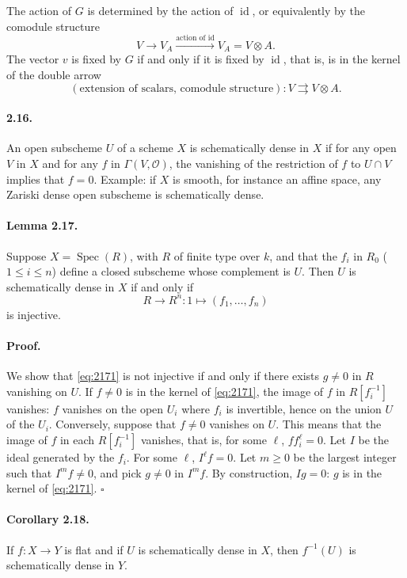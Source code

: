 \documentclass[11pt]{article}
\newcommand{\Spec}{\operatorname{Spec}}
\newcommand{\id}{\operatorname{id}}
\newcommand{\calO}{\mathcal O}
\begin{document}
The action of $G$ is determined by the action of $\id$, or equivalently by the comodule structure
\[
V\longrightarrow V_A \xrightarrow{\text{action of }\id} V_A=V\otimes A.
\]
The vector $v$ is fixed by $G$ if and only if it is fixed by $\id$, that is, is in the kernel of the double arrow
\[
(\text{extension of scalars, comodule structure}): V \rightrightarrows V\otimes A.
\]

\paragraph{2.16.}
An open subscheme $U$ of a scheme $X$ is schematically dense in $X$ if for any open $V$ in $X$ and for any $f$ in $\Gamma(V,\calO)$, the vanishing of the restriction of $f$ to $U\cap V$ implies that $f=0$. Example: if $X$ is smooth, for instance an affine space, any Zariski dense open subscheme is schematically dense.

\paragraph{Lemma 2.17.}
Suppose $X=\Spec(R)$, with $R$ of finite type over $k$, and that the $f_i$ in $R_0$ ($1\leq i\leq n$) define a closed subscheme whose complement is $U$. Then $U$ is schematically dense in $X$ if and only if
\begin{equation}
\label{eq:2171}
R\longrightarrow R^n:1\longmapsto(f_1,\ldots,f_n)
\end{equation}
is injective.

\paragraph{Proof.}
We show that \eqref{eq:2171} is not injective if and only if there exists $g\ne0$ in $R$ vanishing on $U$. If $f\ne0$ is in the kernel of \eqref{eq:2171}, the image of $f$ in $R[f_i^{-1}]$ vanishes: $f$ vanishes on the open $U_i$ where $f_i$ is invertible, hence on the union $U$ of the $U_i$. Conversely, suppose that $f\ne0$ vanishes on $U$. This means that the image of $f$ in each $R[f_i^{-1}]$ vanishes, that is, for some $\ell$, $ff_i^\ell=0$. Let $I$ be the ideal generated by the $f_i$. For some $\ell$, $I^\ell f=0$. Let $m\geq0$ be the largest integer such that $I^m f\ne0$, and pick $g\ne0$ in $I^m f$. By construction, $Ig=0$: $g$ is in the kernel of \eqref{eq:2171}. \hfill $\square$

\paragraph{Corollary 2.18.}
If $f:X\to Y$ is flat and if $U$ is schematically dense in $X$, then $f^{-1}(U)$ is schematically dense in $Y$.
\end{document}

